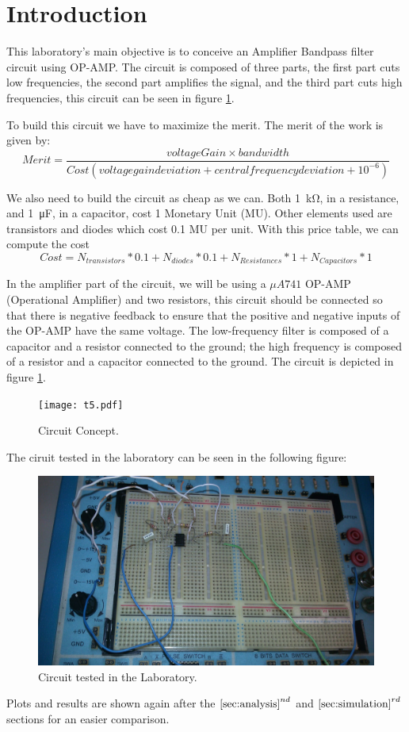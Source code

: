 \section{Introduction}

This laboratory's main objective is to conceive an Amplifier Bandpass filter circuit using OP-AMP. The circuit is composed of three parts, the first part cuts low frequencies, the second part amplifies the signal, and the third part cuts high frequencies, this circuit can be seen in figure \ref{Fig1: circuit}.

To build this circuit we have to maximize the merit. The merit of the work is given by:
\begin{equation}
    Merit = \dfrac{voltageGain \times bandwidth}{Cost (voltage gain deviation + central frequency deviation + 10^{-6})}
\end{equation}

We also need to build the circuit as cheap as we can. Both \SI{1}{\kilo\ohm}, in a resistance, and \SI{1}{\micro\farad}, in a capacitor, cost 1 Monetary Unit (MU). Other elements used are transistors and diodes which cost 0.1 MU per unit.
With this price table, we can compute the cost
\begin{equation}
    Cost = N_{transistors}*0.1+N_{diodes}*0.1+N_{Resistances}*1+N_{Capacitors}*1
\end{equation}

In the amplifier part of the circuit, we will be using a $\mu A741$ OP-AMP (Operational Amplifier) and two resistors, this circuit should be connected so that there is negative feedback to ensure that the positive and negative inputs of the OP-AMP have the same voltage. The low-frequency filter is composed of a capacitor and a resistor connected to the ground; the high frequency is composed of a resistor and a capacitor connected to the ground. The circuit is depicted in figure \ref{Fig1: circuit}.

\begin{figure}[h] 
\centering
\texttt{[image: t5.pdf]}
\caption{Circuit Concept.}
\label{Fig1: circuit}
\end{figure}

The ciruit tested in the laboratory can be seen in the following figure:

\begin{figure}[h] 
\centering
\includegraphics[width=0.6\linewidth]{Lab_Circuit.jpeg}
\caption{Circuit tested in the Laboratory.}
\label{Fig1.1: labcircuit}
\end{figure}

Plots and results are shown again after the $\ref{sec:analysis}^{nd}$ and $\ref{sec:simulation}^{rd}$ sections for an easier comparison.
